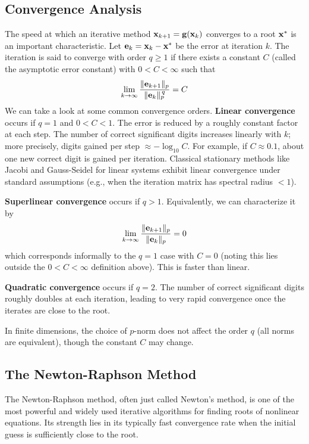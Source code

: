 \subsection{Convergence Analysis}
The speed at which an iterative method $\mathbf{x}_{k+1} = \mathbf{g}(\mathbf{x}_k)$ converges to a root $\mathbf{x}^*$ is an important characteristic. Let $\mathbf{e}_k = \mathbf{x}_k - \mathbf{x}^*$ be the error at iteration $k$. The iteration is said to converge with order $q \ge 1$ if there exists a constant $C$ (called the asymptotic error constant) with $0<C<\infty$ such that
\begin{equation}
    \lim_{k\to\infty} \frac{\|\mathbf{e}_{k+1}\|_p}{\|\mathbf{e}_k\|_p^{\,q}} = C
\end{equation}
We can take a look at some common convergence orders. \textbf{Linear convergence} occurs if $q=1$ and $0<C<1$. The error is reduced by a roughly constant factor at each step. The number of correct significant digits increases linearly with $k$; more precisely, digits gained per step $\approx -\log_{10} C$. For example, if $C \approx 0.1$, about one new correct digit is gained per iteration. Classical stationary methods like Jacobi and Gauss-Seidel for linear systems exhibit linear convergence under standard assumptions (e.g., when the iteration matrix has spectral radius $<1$).

\textbf{Superlinear convergence} occurs if $q>1$. Equivalently, we can characterize it by
\begin{equation}
  \lim_{k\to\infty}\frac{\|\mathbf{e}_{k+1}\|_p}{\|\mathbf{e}_k\|_p}=0
\end{equation}
which corresponds informally to the $q=1$ case with $C=0$ (noting this lies outside the $0<C<\infty$ definition above). This is faster than linear.

\textbf{Quadratic convergence} occurs if $q=2$. The number of correct significant digits roughly doubles at each iteration, leading to very rapid convergence once the iterates are close to the root.

In finite dimensions, the choice of $p$-norm does not affect the order $q$ (all norms are equivalent), though the constant $C$ may change.



\subsection{The Newton-Raphson Method}
The Newton-Raphson method, often just called Newton's method, is one of the most powerful and widely used iterative algorithms for finding roots of nonlinear equations. Its strength lies in its typically fast convergence rate when the initial guess is sufficiently close to the root.

